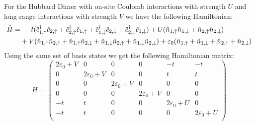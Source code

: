 \documentclass[12pt]{article}
\begin{document}
\newpage
\noindent
For the Hubbard Dimer with on-site Coulomb interactions with strength $U$ and long-range interactions with strength $V$ we have the following Hamiltonian:
\begin{align}
\hat{H}=&\ -t(\hat{c}_{1,\uparrow}^\dagger \hat{c}_{2,\uparrow}+\hat{c}_{2,\uparrow}^\dagger \hat{c}_{1,\uparrow}+\hat{c}_{1,\downarrow}^\dagger \hat{c}_{2,\downarrow}+\hat{c}_{2,\downarrow}^\dagger \hat{c}_{1,\downarrow}) + U(\hat{n}_{1,\uparrow}\hat{n}_{1,\downarrow}+\hat{n}_{2,\uparrow}\hat{n}_{2,\downarrow})\\
&+ V(\hat{n}_{1,\uparrow}\hat{n}_{2,\uparrow}+\hat{n}_{1,\uparrow}\hat{n}_{2,\downarrow}+\hat{n}_{1,\downarrow}\hat{n}_{2,\uparrow}+\hat{n}_{1,\downarrow}\hat{n}_{2,\downarrow})+ \varepsilon_0(\hat{n}_{1,\uparrow}+\hat{n}_{1,\downarrow}+\hat{n}_{2,\uparrow}+\hat{n}_{2,\downarrow})\notag
\end{align}
Using the same set of basis states we get the following Hamiltonian matrix:
\begin{equation}
H=\begin{pmatrix}
2\varepsilon_0+V & 0 & 0 & 0 & -t & -t\\
0 & 2\varepsilon_0+V & 0 & 0 & t & t\\
0& 0 & 2\varepsilon_0+V & 0 & 0 & 0\\
0 & 0& 0 & 2\varepsilon_0+V & 0 & 0\\
-t & t & 0& 0 & 2\varepsilon_0 + U & 0\\
-t & t & 0& 0&0 & 2\varepsilon_0+U\\
\end{pmatrix}
\end{equation}
\end{document}
